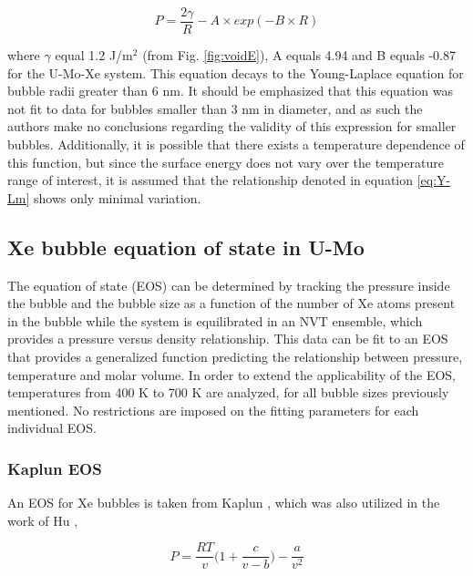 \documentclass[review]{elsarticle}
\begin{document}
\begin{equation}
\label{eq:Y-Lm}
P = \frac{2\gamma}{R} - A \times exp(-B\times R)
\end{equation}

where $\gamma$ equal 1.2 J/m$^2$ (from Fig. \ref{fig:voidE}), A equals 4.94 and B equals -0.87 for the U-Mo-Xe system. This equation decays to the Young-Laplace equation for bubble radii greater than 6 nm. It should be emphasized that this equation was not fit to data for bubbles smaller than 3 nm in diameter, and as such the authors make no conclusions regarding the validity of this expression for smaller bubbles. Additionally, it is possible that there exists a temperature dependence of this function, but since the surface energy does not vary over the temperature range of interest, it is assumed that the relationship denoted in equation \ref{eq:Y-Lm} shows only minimal variation.


\FloatBarrier

\subsection{Xe bubble equation of state in U-Mo}

The equation of state (EOS) can be determined by tracking the pressure inside the bubble and the bubble size as a function of the number of Xe atoms present in the bubble while the system is equilibrated in an NVT ensemble, which provides a pressure versus density relationship. This data can be fit to an EOS that provides a generalized function predicting the relationship between pressure, temperature and molar volume. In order to extend the applicability of the EOS, temperatures from 400 K to 700 K are analyzed, for all bubble sizes previously mentioned. No restrictions are imposed on the fitting parameters for each individual EOS. 

\subsubsection{Kaplun EOS}\label{kapluneos}

An EOS for Xe bubbles is taken from Kaplun \cite{kaplun2003}, which was also utilized in the work of Hu \cite{hu2017}, 

\begin{equation}
\label{eq:EOS}
P=\frac{RT}{v}\bigg( 1+\frac{c}{v-b}\bigg)-\frac{a}{v^2}
\end{equation}
				
\end{document}

